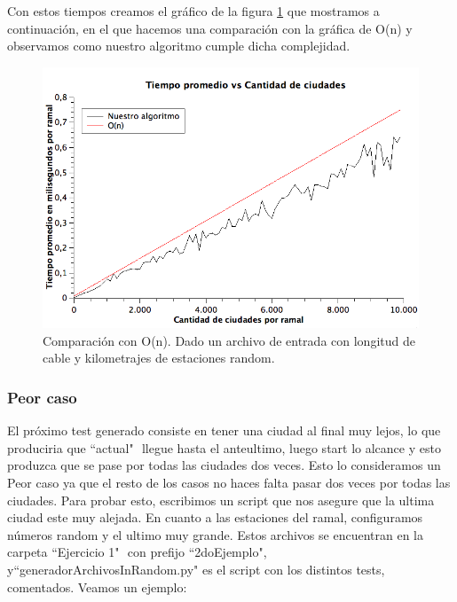 Con estos tiempos creamos el gráfico de la figura \ref{ej1-tiempo-vs-cant-ciudades-random} que mostramos a continuación, en el que hacemos una comparación con la gráfica de O(n) y observamos como nuestro algoritmo cumple dicha complejidad.

\begin{figure}[H]
\begin{center}

  \includegraphics[width=\linewidth]{../graficos/ej1/TIempoPromedioVsCantidadCIudades.png}
  \caption{{\small Comparación con O(n). Dado un archivo de entrada con longitud de cable y kilometrajes de estaciones random.}} \label{ej1-tiempo-vs-cant-ciudades-random}
\endminipage

\end{center}
\end{figure}


\subsubsection{Peor caso}

El próximo test generado consiste en tener una ciudad al final muy lejos, lo que produciria que ``actual" $ $ llegue hasta el anteultimo, luego start lo alcance y esto produzca que se pase por todas las ciudades dos veces. Esto lo consideramos un Peor caso ya que el resto de los casos no haces falta pasar dos veces por todas las ciudades.  Para probar esto, escribimos un script que nos asegure que la ultima ciudad este muy alejada. En cuanto a las estaciones del ramal, configuramos números random y el ultimo muy grande. Estos archivos se encuentran en la carpeta ``Ejercicio 1" $ $ con prefijo ``2doEjemplo", y``generadorArchivosInRandom.py" $ $es el script con los distintos tests, comentados. Veamos un ejemplo:\\

